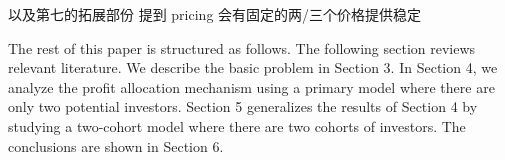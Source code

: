 以及第七的拓展部份 提到 pricing 会有固定的两/三个价格提供稳定

The rest of this paper is structured as follows. The following section reviews relevant literature. We describe the basic problem in Section 3. In Section 4, we analyze the profit allocation mechanism using a
primary model where there are only two potential investors. Section 5 generalizes the results of Section 4 by studying a two-cohort model where there are two cohorts of investors. The conclusions are shown in Section 6.

